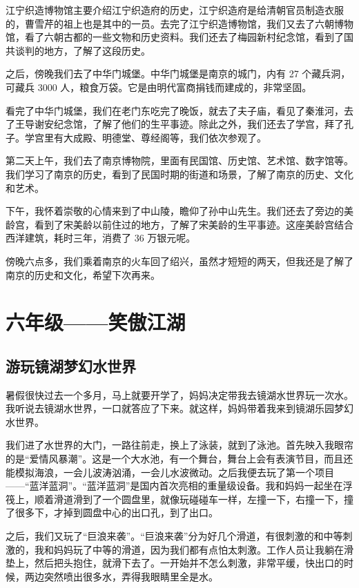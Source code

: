\documentclass[UTF8,a4paper,titlepage,twoside,10.5pt]{article}
\begin{document}
江宁织造博物馆主要介绍江宁织造府的历史，江宁织造府是给清朝官员制造衣服的，曹雪芹的祖上也是其中的一员。去完了江宁织造博物馆，我们又去了六朝博物馆，看了六朝古都的一些文物和历史资料。我们还去了梅园新村纪念馆，看到了国共谈判的地方，了解了这段历史。

之后，傍晚我们去了中华门城堡。中华门城堡是南京的城门，内有 27 个藏兵洞，可藏兵 3000 人，粮食万袋。它是由明代富商捐钱而建成的，非常坚固。

看完了中华门城堡，我们在老门东吃完了晚饭，就去了夫子庙，看见了秦淮河，去了王导谢安纪念馆，了解了他们的生平事迹。除此之外，我们还去了学宫，拜了孔子。学宫里有大成殿、明德堂、尊经阁等，我们依次参观了。

第二天上午，我们去了南京博物院，里面有民国馆、历史馆、艺术馆、数字馆等。我们学习了南京的历史，看到了民国时期的街道和场景，了解了南京的历史、文化和艺术。

下午，我怀着崇敬的心情来到了中山陵，瞻仰了孙中山先生。我们还去了旁边的美龄宫，看到了宋美龄以前住过的地方，了解了宋美龄的生平事迹。这座美龄宫结合西洋建筑，耗时三年，消费了 36 万银元呢。

傍晚六点多，我们乘着南京的火车回了绍兴，虽然才短短的两天，但我还是了解了南京的历史和文化，希望下次再来。

\newpage

\section{六年级——笑傲江湖}
\label{sec:org938b8bf}

\subsection{游玩镜湖梦幻水世界}
\label{sec:org83132f4}

暑假很快过去一个多月，马上就要开学了，妈妈决定带我去镜湖水世界玩一次水。我听说去镜湖水世界，一口就答应了下来。就这样，妈妈带着我来到镜湖乐园梦幻水世界。

我们进了水世界的大门，一路往前走，换上了泳装，就到了泳池。首先映入我眼帘的是“爱情风暴潮”。这是一个大水池，有一个舞台，舞台上会有表演节目，而且还能模拟海浪，一会儿波涛汹涌，一会儿水波微动。之后我便去玩了第一个项目——“蓝洋蓝洞”。“蓝洋蓝洞”是国内首次亮相的重量级设备。我和妈妈一起坐在浮筏上，顺着滑道滑到了一个圆盘里，就像玩碰碰车一样，左撞一下，右撞一下，撞了很多下，才掉到圆盘中心的出口孔，到了出口。

之后，我们又玩了“巨浪来袭”。“巨浪来袭”分为好几个滑道，有很刺激的和中等刺激的，我和妈妈玩了中等的滑道，因为我们都有点怕太刺激。工作人员让我躺在滑垫上，然后把头抱住，就滑下去了。一开始并不怎么刺激，非常平缓，快出口的时候，两边突然喷出很多水，弄得我眼睛里全是水。
\end{document}
